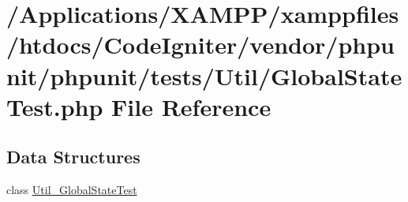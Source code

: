 \hypertarget{_global_state_test_8php}{}\section{/\+Applications/\+X\+A\+M\+P\+P/xamppfiles/htdocs/\+Code\+Igniter/vendor/phpunit/phpunit/tests/\+Util/\+Global\+State\+Test.php File Reference}
\label{_global_state_test_8php}
\subsection*{Data Structures}
\begin{DoxyCompactItemize}
\item 
class \mbox{\hyperlink{class_util___global_state_test}{Util\+\_\+\+Global\+State\+Test}}
\end{DoxyCompactItemize}
